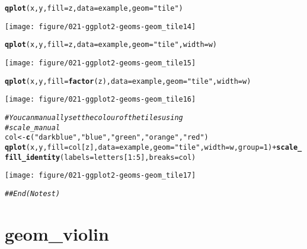 \documentclass[a4paper,titlepage]{tufte-handout}\usepackage[]{graphicx}\usepackage[]{color}
\makeatletter
\def\maxwidth{ %
  \ifdim\Gin@nat@width>\linewidth
    \linewidth
  \else
    \Gin@nat@width
  \fi
}
\newcommand{\hlnum}[1]{\textcolor[rgb]{0.686,0.059,0.569}{#1}}%
\newcommand{\hlstr}[1]{\textcolor[rgb]{0.192,0.494,0.8}{#1}}%
\newcommand{\hlcom}[1]{\textcolor[rgb]{0.678,0.584,0.686}{\textit{#1}}}%
\newcommand{\hlopt}[1]{\textcolor[rgb]{0,0,0}{#1}}%
\newcommand{\hlstd}[1]{\textcolor[rgb]{0.345,0.345,0.345}{#1}}%
\newcommand{\hlkwb}[1]{\textcolor[rgb]{0.69,0.353,0.396}{#1}}%
\newcommand{\hlkwc}[1]{\textcolor[rgb]{0.333,0.667,0.333}{#1}}%
\newcommand{\hlkwd}[1]{\textcolor[rgb]{0.737,0.353,0.396}{\textbf{#1}}}%
\newenvironment{kframe}{%
 \def\at@end@of@kframe{}%
 \ifinner\ifhmode%
  \def\at@end@of@kframe{\end{minipage}}%
  \begin{minipage}{\columnwidth}%
 \fi\fi%
 \def\FrameCommand##1{\hskip\@totalleftmargin \hskip-\fboxsep
 \colorbox{shadecolor}{##1}\hskip-\fboxsep
     \hskip-\linewidth \hskip-\@totalleftmargin \hskip\columnwidth}%
 \MakeFramed {\advance\hsize-\width
   \@totalleftmargin\z@ \linewidth\hsize
   \@setminipage}}%
 {\par\unskip\endMakeFramed%
 \at@end@of@kframe}
\newenvironment{knitrout}{}{} %
\makeatother
\begin{document}
\begin{knitrout}
\begin{kframe}
\begin{alltt}
\hlkwd{qplot}\hlstd{(x, y,} \hlkwc{fill}\hlstd{=z,} \hlkwc{data}\hlstd{=example,} \hlkwc{geom}\hlstd{=}\hlstr{"tile"}\hlstd{)}
\end{alltt}
\end{kframe}
\texttt{[image: figure/021-ggplot2-geoms-geom\_tile14]} 
\begin{kframe}\begin{alltt}
\hlkwd{qplot}\hlstd{(x, y,} \hlkwc{fill}\hlstd{=z,} \hlkwc{data}\hlstd{=example,} \hlkwc{geom}\hlstd{=}\hlstr{"tile"}\hlstd{,} \hlkwc{width}\hlstd{=w)}
\end{alltt}
\end{kframe}
\texttt{[image: figure/021-ggplot2-geoms-geom\_tile15]} 
\begin{kframe}\begin{alltt}
\hlkwd{qplot}\hlstd{(x, y,} \hlkwc{fill}\hlstd{=}\hlkwd{factor}\hlstd{(z),} \hlkwc{data}\hlstd{=example,} \hlkwc{geom}\hlstd{=}\hlstr{"tile"}\hlstd{,} \hlkwc{width}\hlstd{=w)}
\end{alltt}
\end{kframe}
\texttt{[image: figure/021-ggplot2-geoms-geom\_tile16]} 
\begin{kframe}\begin{alltt}
\hlcom{# You can manually set the colour of the tiles using}
\hlcom{# scale_manual}
\hlstd{col} \hlkwb{<-} \hlkwd{c}\hlstd{(}\hlstr{"darkblue"}\hlstd{,} \hlstr{"blue"}\hlstd{,} \hlstr{"green"}\hlstd{,} \hlstr{"orange"}\hlstd{,} \hlstr{"red"}\hlstd{)}
\hlkwd{qplot}\hlstd{(x, y,} \hlkwc{fill}\hlstd{=col[z],} \hlkwc{data}\hlstd{=example,} \hlkwc{geom}\hlstd{=}\hlstr{"tile"}\hlstd{,} \hlkwc{width}\hlstd{=w,} \hlkwc{group}\hlstd{=}\hlnum{1}\hlstd{)} \hlopt{+} \hlkwd{scale_fill_identity}\hlstd{(}\hlkwc{labels}\hlstd{=letters[}\hlnum{1}\hlopt{:}\hlnum{5}\hlstd{],} \hlkwc{breaks}\hlstd{=col)}
\end{alltt}
\end{kframe}
\texttt{[image: figure/021-ggplot2-geoms-geom\_tile17]} 
\begin{kframe}\begin{alltt}
\hlcom{## End(No test)}
\end{alltt}
\end{kframe}
\end{knitrout}



\section{geom\_violin}
\end{document}
